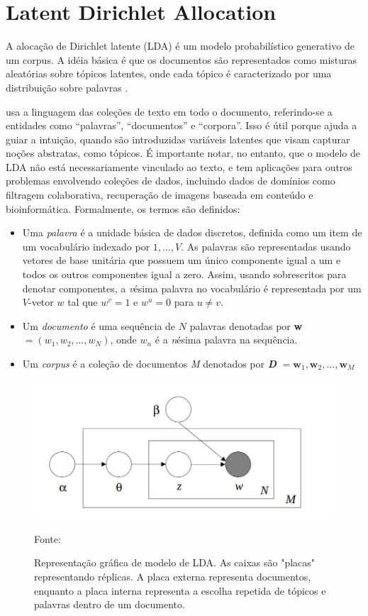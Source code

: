\section{Latent Dirichlet Allocation}


A alocação de Dirichlet latente (LDA) é um modelo probabilístico generativo de um corpus. A idéia básica é que os documentos são representados como misturas aleatórias sobre tópicos latentes, onde cada tópico é caracterizado por uma distribuição sobre palavras \cite{blei2003}.

\cite{blei2003} usa a linguagem das coleções de texto em todo o documento, referindo-se a entidades como “palavras”, “documentos” e “corpora”. Isso é útil porque ajuda a guiar a intuição, quando são introduzidas variáveis latentes que visam capturar noções abstratas, como tópicos.
É importante notar, no entanto, que o modelo de LDA não está necessariamente vinculado ao texto, e tem aplicações para outros problemas envolvendo coleções de dados, incluindo dados de domínios como filtragem colaborativa, recuperação de imagens baseada em conteúdo e bioinformática. Formalmente, os termos são definidos:

\begin{itemize}
	\item Uma \textit{palavra} é a unidade básica de dados discretos, definida como um item de um vocabulário indexado por ${1,\dots, V}$. As palavras são representadas usando vetores de base unitária que possuem um único componente igual a um  e todos os outros componentes igual a zero. Assim, usando sobrescritos para denotar componentes, a \textit{v}ésima palavra no vocabulário é representada por um $V$-vetor $w$ tal que $w^v = 1$ e $w^u = 0$ para $u \neq v$.
	\item Um \textit{documento} é uma sequência de $N$ palavras denotadas por \textbf{w} $=(w_1,w_2,\dots,w_N)$, onde $w_n$ é a \textit{n}ésima palavra na sequência.
	\item Um \textit{corpus} é a coleção de documentos \textit{M} denotados por \textbf{\textit{D}} $={\textbf{w}_1, \textbf{w}_2, \dots, \textbf{w}_M}$
\end{itemize}


\begin{figure}[!h]
	\centering
	\includegraphics[keepaspectratio=true,scale=0.4]{figuras/lda1.png}
	\caption{Representação gráfica de modelo de LDA. As caixas são "placas" representando réplicas. A placa externa representa documentos, enquanto a placa interna representa a escolha repetida de tópicos e palavras dentro de um documento.}
	Fonte: \cite{blei2003}
	\label{fig:lda}
\end{figure}


